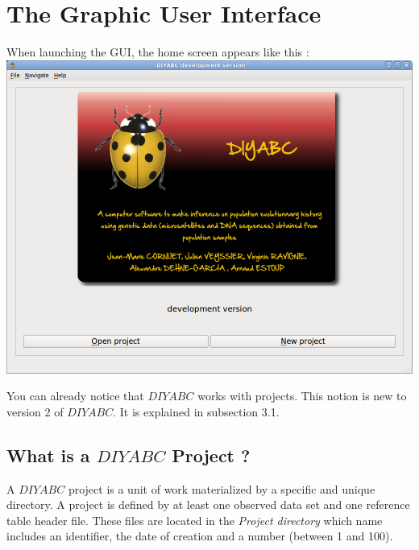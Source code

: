 \section{The Graphic User Interface}

When launching the GUI, the home screen appears like this :\\


\includegraphics[scale=0.4]{gui_pictures/Capture-DIYABC-1.png} 

You can already notice that $DIYABC$ works with projects. This notion is new to version 2 of $DIYABC$. It is explained in subsection 3.1.

\subsection{What is a $DIYABC$ Project ?}

A $DIYABC$ project is a unit of work materialized by a specific and unique directory. A project is defined by at least one observed data set and one reference table header file. These files are located in the \emph{Project directory} which name includes an identifier, the date of creation and a number (between 1 and 100).\\

